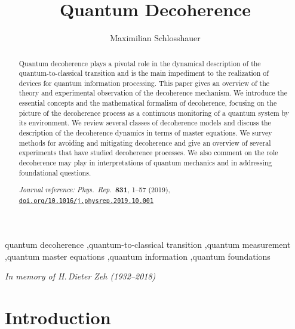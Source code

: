 \documentclass[3p,sort&compress,12pt]{elsarticle}
\begin{document}
\begin{frontmatter}

\title{Quantum Decoherence}
\author{Maximilian Schlosshauer} 
\address{Department of Physics, University of Portland,\\5000 North Willamette Boulevard, Portland, OR 97203, USA}

\begin{abstract}
Quantum decoherence plays a pivotal role in the dynamical description of the quantum-to-classical transition and is the main impediment to the realization of devices for quantum information processing. This paper gives an overview of the theory and experimental observation of the decoherence mechanism. We introduce the essential concepts and the mathematical formalism of decoherence, focusing on the picture of the decoherence process as a continuous monitoring of a quantum system by its environment. We review several classes of decoherence models and discuss the description of the decoherence dynamics in terms of master equations. We survey methods for avoiding and mitigating decoherence and give an overview of several experiments that have studied decoherence processes. We also comment on the role decoherence may play in interpretations of quantum mechanics and in addressing foundational questions.


{
\medskip
\noindent
\emph{Journal reference:} \emph{Phys.\ Rep.\ }{\bf 831}, 1--57 (2019), \hfill \\
\href{https://doi.org/10.1016/j.physrep.2019.10.001}{\texttt{doi.org/10.1016/j.physrep.2019.10.001}}
\medskip
}

\end{abstract}

\begin{keyword}
quantum decoherence \sep quantum-to-classical transition \sep quantum measurement \sep quantum master equations \sep quantum information \sep quantum foundations 
\end{keyword}

\end{frontmatter}

\vspace{.4cm}

\begin{center}
\emph{In memory of H.\,Dieter Zeh (1932--2018)}
\end{center}

\newpage
\tableofcontents
\newpage

\section{Introduction}
\end{document}
